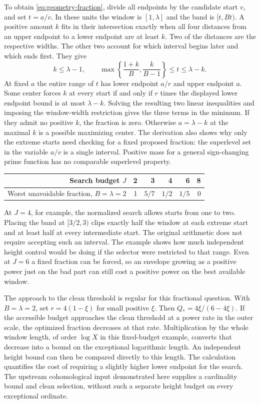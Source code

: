 \documentclass[12pt,letterpaper]{article}
\begin{document}
To obtain \eqref{eq:geometry-fraction}, divide all endpoints by the candidate start \(v\), and set \(t=a/v\). In these units the window is \([1,\lambda]\) and the band is \([t,Bt)\). A positive amount \(k\) fits in their intersection exactly when all four distances from an upper endpoint to a lower endpoint are at least \(k\). Two of the distances are the respective widths. The other two account for which interval begins later and which ends first. They give
\[
 k\le\lambda-1,\qquad
       \max\!\left\{\frac{1+k}{B},\frac{k}{B-1}\right\}
                \le t\le\lambda-k .
\]
At fixed \(a\) the entire range of \(t\) has lower endpoint \(a/r\) and upper endpoint \(a\). Some center forces \(k\) at every start if and only if \(r\) times the displayed lower endpoint bound is at most \(\lambda-k\). Solving the resulting two linear inequalities and imposing the window-width restriction gives the three terms in the minimum. If they admit no positive \(k\), the fraction is zero. Otherwise \(a=\lambda-k\) at the maximal \(k\) is a possible maximizing center. The derivation also shows why only the extreme starts need checking for a fixed proposed fraction: the superlevel set in the variable \(a/v\) is a single interval. Positive mass for a general sign-changing prime function has no comparable superlevel property.

\begin{center}
\begin{tabular}{rrrrrr}
\toprule
Search budget \(J\) & 2 & 3 & 4 & 6 & 8 \\
\midrule
Worst unavoidable fraction, \(B=\lambda=2\)
    & 1 & \(5/7\) & \(1/2\) & \(1/5\) & 0 \\
\bottomrule
\end{tabular}
\end{center}
At \(J=4\), for example, the normalized search allows starts from one to two. Placing the band at \([3/2,3)\) clips exactly half the window at each extreme start and at least half at every intermediate start. The original arithmetic does not require accepting such an interval. The example shows how much independent height control would be doing if the selector were restricted to that range. Even at \(J=6\) a fixed fraction can be forced, so an envelope growing as a positive power just on the bad part can still cost a positive power on the best available window.

The approach to the clean threshold is regular for this fractional question. With \(B=\lambda=2\), set \(r=4(1-\xi)\) for small positive \(\xi\). Then \(Q_*=4\xi/(6-4\xi)\). If the accessible budget approaches the clean threshold at a power rate in the outer scale, the optimized fraction decreases at that rate. Multiplication by the whole window length, of order \(\log X\) in this fixed-budget example, converts that decrease into a bound on the exceptional logarithmic length. An independent height bound can then be compared directly to this length. The calculation quantifies the cost of requiring a slightly higher lower endpoint for the search. The upstream cohomological input demonstrated here supplies a cardinality bound and clean selection, without such a separate height budget on every exceptional ordinate.
\end{document}
